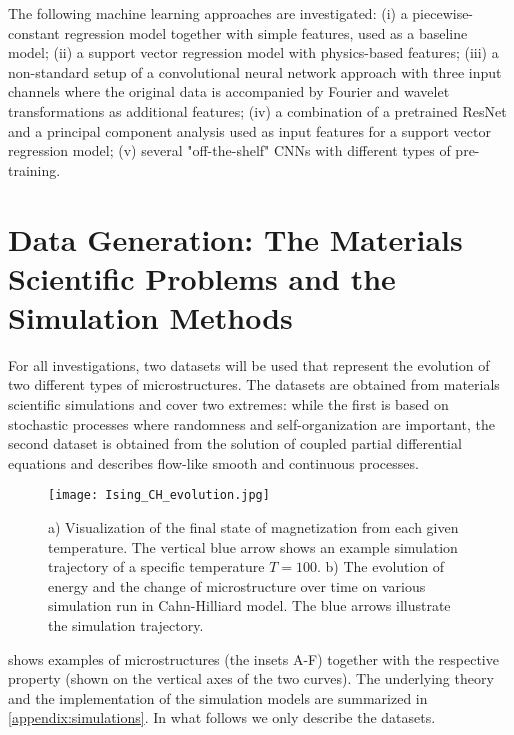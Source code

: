 \documentclass[11pt, authoryear]{elsarticle}
\begin{document}
	The following machine learning approaches are investigated: 
	(i) a piecewise-constant regression model together with 
	simple features, used as a baseline model; (ii) a support vector 
	regression model with physics-based features; (iii) a non-standard setup 
	of a convolutional neural network approach with three input channels where the 
	original data is accompanied by Fourier and wavelet transformations as 
	additional features; (iv) a combination of a pretrained ResNet and a principal 
	component analysis used as input features for a support vector regression 
	model; (v) several "off-the-shelf" CNNs with different types of pre-training. 
	
	
	
	\section{Data Generation: The Materials Scientific Problems and the Simulation Methods} 
	\label{sec:methods}
	For all investigations, two datasets will be used that represent the evolution 
	of two different types of microstructures. The datasets are obtained from 
	materials scientific simulations and cover two extremes: while the first is 
	based on stochastic processes where randomness and self-organization are 
	important, the second dataset is obtained from the solution of coupled partial 
	differential equations and describes flow-like smooth and continuous processes. 
	\begin{figure}
		\centering
		\texttt{[image: Ising\_CH\_evolution.jpg]}
		\caption[]{%
			a) Visualization of the final state of magnetization from each given 
			temperature. The vertical blue arrow shows an example simulation 
			trajectory of a specific temperature $T=100$. b) The evolution of 
			energy and the change of microstructure over time on various simulation 
			run in Cahn-Hilliard model. The blue arrows illustrate the simulation 
			trajectory.
		}	
		\label{fig:Ising_CH_evolution}
	\end{figure}
	 shows examples of microstructures (the insets 
	A-F) together with the respective property (shown on the vertical axes of the 
	two curves). The underlying theory and the implementation of the 
	simulation models are summarized in \ref{appendix:simulations}. In what follows 
	we only describe the datasets.
	
\end{document}
